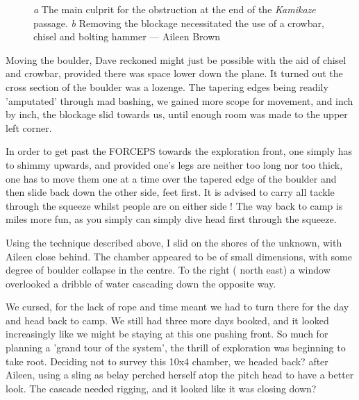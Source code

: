 \begin{figure}[t!]
\checkoddpage \ifoddpage \forcerectofloat \else \forceversofloat \fi
\centering
    \begin{subfigure}[t]{0.423\textwidth}
        \centering
        \caption{} \label{boulder_kamikaze}
    \end{subfigure}
        \hfill
\begin{subfigure}[t]{0.567\textwidth}
\centering
{}
 \caption{}\label{end of kamikaze}
\end{subfigure}
  \caption{
    \emph{a} The main culprit for the obstruction at the end of the \emph{Kamikaze} passage. 
     \emph{b}  Removing the blockage necessitated the use of a crowbar, chisel and bolting hammer --- Aileen Brown }
\end{figure}


Moving the boulder, Dave reckoned might just be possible with the aid of chisel and crowbar, provided there was space lower down the plane. It turned out the cross section of the boulder was a lozenge. The tapering edges being readily 'amputated' through mad bashing, we gained more scope for movement, and inch by inch, the blockage slid towards us, until enough room was made to the upper left corner.

In order to get past the FORCEPS towards the exploration front, one simply has to shimmy upwards, and provided one's legs are neither too long nor too thick, one has to move them one at a time over the tapered edge of the boulder and then slide back down the other side, feet first. It is advised to carry all tackle through the squeeze whilst people are on either side ! The way back to camp is miles more fun, as you simply can simply dive head first through the squeeze.

Using the technique described above, I slid on the shores of the unknown, with Aileen close behind. The chamber appeared to be of small dimensions, with some degree of boulder collapse in the centre. To the right ( north east) a window overlooked a dribble of water cascading down the opposite way.

We cursed, for the lack of rope and time meant we had to turn there for the day and head back to camp. We still had three more days booked, and it looked increasingly like we might be staying at this one pushing front. So much for planning a 'grand tour of the system', the thrill of exploration was beginning to take root. Deciding not to survey this 10x4 chamber, we headed back? after Aileen, using a sling as belay perched herself atop the pitch head to have a better look. The cascade needed rigging, and it looked like it was closing down?

